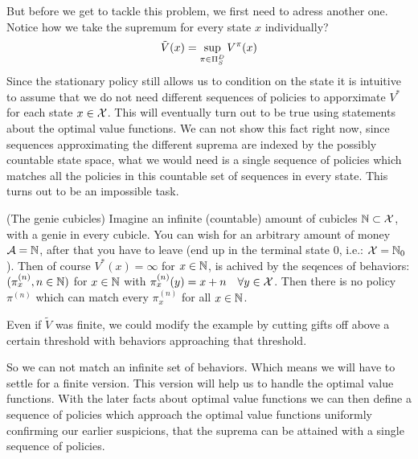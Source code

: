 But before we get to tackle this problem, we first need to adress another one. Notice how we take the supremum for every state \(x\) individually? 
\begin{equation*}
\tilde{V}(x)=\sup_{\pi\in\Pi_S^D}V^\pi(x) 
\end{equation*}
Since the stationary policy still allows us to condition on the state it is intuitive to assume that we do not need different sequences of policies to apporximate \(V^*\) for each state \(x\in\mathcal{X}\). This will eventually turn out to be true using statements about the optimal value functions. We can not show this fact right now, since sequences approximating the different suprema are indexed by the possibly countable state space, what we would need is a single sequence of policies which matches all the policies in this countable set of sequences in every state. This turns out to be an impossible task.

\begin{example} (The genie cubicles)
Imagine an infinite (countable) amount of cubicles \(\mathbb{N} \subset \mathcal{X}\), with a genie in every cubicle. You can wish for an arbitrary amount of money \(\mathcal{A}=\mathbb{N}\), after that you have to leave (end up in the terminal state \(0\), i.e.: \(\mathcal{X}=\mathbb{N}_0\)). Then of course \(V^*(x)=\infty\) for \(x\in\mathbb{N}\), is achived by the seqences of behaviors: \((\pi_x^{(n)}, n\in\mathbb{N})\) for \(x\in\mathbb{N}\) with \(\pi_x^{(n)}(y)=x+n\quad \forall y\in\mathcal{X}\). Then there is no policy \(\pi^{(n)}\) which can match every \(\pi_x^{(n)}\) for all \(x\in\mathbb{N}\).

Even if \(\tilde{V}\) was finite, we could modify the example by cutting gifts off above a certain threshold with behaviors approaching that threshold. 
\end{example}

So we can not match an infinite set of behaviors. Which means we will have to settle for a finite version. This version will help us to handle the optimal value functions. With the later facts about optimal value functions we can then define a sequence of policies which approach the optimal value functions uniformly confirming our earlier suspicions, that the suprema can be attained with a single sequence of policies. 

